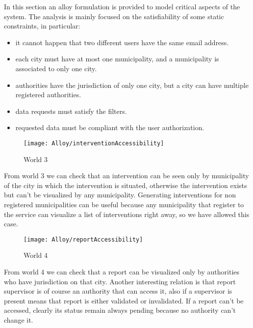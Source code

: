 In this section an alloy formulation is provided to model critical aspects of the system. The analysis is mainly focused on the satisfiability of some static constraints, in particular:
\begin{itemize}
	\item it cannot happen that two different users have the same email address.
	\item each city must have at most one municipality, and a municipality is associated to only one city.
	\item authorities have the jurisdiction of only one city, but a city can have multiple registered authorities.
	\item data requests must satisfy the filters.
	\item requested data must be compliant with the user authorization.
\end{itemize}

\vspace{10mm}



\begin{figure}[H]
	\centering
	\texttt{[image: Alloy/interventionAccessibility]}
	\caption{World 3}
\end{figure}

From world 3 we can check that an intervention can be seen only by municipality of the city in which the intervention is situated, otherwise the intervention exists but can't be visualized by any municipality. Generating interventions for non registered municipalities can be useful because any municipality that register to the service can visualize a list of interventions right away, so we have allowed this case.

\begin{figure}[H]
	\centering
	\texttt{[image: Alloy/reportAccessibility]}
	\caption{World 4}
\end{figure}

From world 4 we can check that a report can be visualized only by authorities who have jurisdiction on that city. Another interesting relation is that report supervisor is of course an authority that can access it, also if a supervisor is present means that report is either validated or invalidated. If a report can't be accessed, clearly its status remain always pending because no authority can't change it.
